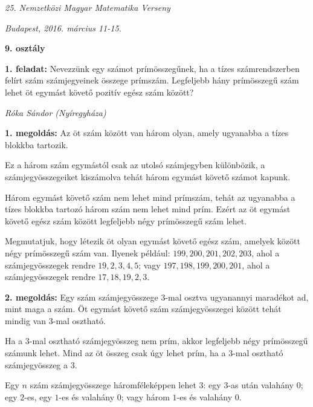 \documentclass[a4paper,10pt]{article}
\newcommand{\ki}[2]{\hfill {\it #1 (#2)}\medskip}
\begin{document}
\begin{center} \Large {\em 25. Nemzetközi Magyar Matematika Verseny} \end{center}
\begin{center} \large{\em Budapest, 2016. március 11-15.} \end{center}
\smallskip
\begin{center} \large{\bf 9. osztály} \end{center}
\bigskip 

{\bf 1. feladat: } Nevezzünk egy számot prímösszegűnek, ha a tízes számrendszerben felírt szám számjegyeinek összege prímszám. Legfeljebb hány prímösszegű szám lehet öt egymást követő pozitív egész szám között?

\ki{Róka Sándor}{Nyíregyháza}\medskip

{\bf 1. megoldás: } Az öt szám között van három olyan, amely ugyanabba a tízes blokkba tartozik. 

\smallskip

\noindent Ez a három szám egymástól csak az utolsó számjegyben különbözik, a számjegyösszegeiket kiszámolva tehát három egymást követő számot kapunk.


\smallskip

\noindent Három egymást követő szám nem lehet mind prímszám, tehát az ugyanabba a tízes blokkba tartozó három szám nem lehet mind prím. Ezért az öt egymást követő egész szám között legfeljebb négy prímösszegű szám lehet.


\smallskip

\noindent Megmutatjuk, hogy létezik öt olyan egymást követő egész szám, amelyek között négy prímösszegű szám van. Ilyenek például: $199, 200, 201, 202, 203$, ahol a számjegyösszegek rendre $19, 2, 3, 4, 5$; vagy $197, 198, 199, 200, 201$, ahol a számjegyösszegek rendre $17, 18, 19, 2, 3$.

\medskip


{\bf 2. megoldás: } Egy szám számjegyösszege $3$-mal osztva ugyanannyi maradékot ad, mint maga a szám. 
Öt egymást követő szám számjegyösszegei között tehát mindig van $3$-mal osztható.

\smallskip

\noindent Ha a 3-mal osztható számjegyösszeg nem prím, akkor legfeljebb négy prímösszegű számunk lehet.
Mind az öt összeg csak úgy lehet prím, ha a $3$-mal osztható számjegyösszeg a $3$.

\smallskip

\noindent Egy $n$ szám számjegyösszege háromféleképpen lehet $3$: egy $3$-as után valahány $0$; egy $2$-es, egy $1$-es és valahány $0$; vagy három $1$-es és valahány $0$.
\end{document}
